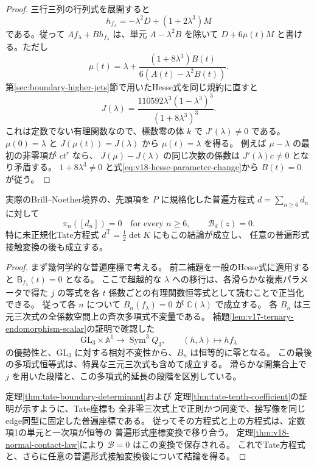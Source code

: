 \begin{proof}
三行三列の行列式を展開すると
\[
 h_{f_\lambda}=-\lambda^2D+(1+2\lambda^3)M
\]
である。従って $A f_\lambda+B h_{f_\lambda}$ は、単元 $A-\lambda^2B$ を除いて
$D+6\mu(t)M$ と書ける。ただし
\begin{equation}\label{eq:v18-hesse-parameter-change}
 \mu(t)=\lambda+
 \frac{(1+8\lambda^3)B(t)}{6(A(t)-\lambda^2B(t))}.
\end{equation}
第\ref{sec:boundary-higher-jets}節で用いたHesse式を同じ規約に直すと
\begin{equation}\label{eq:v18-hesse-j-function}
 J(\lambda)=
 \frac{110592\lambda^3(1-\lambda^3)^3}{(1+8\lambda^3)^3}.
\end{equation}
これは定数でない有理関数なので、標数零の体 $k$ で $J'(\lambda)\ne0$ である。
$\mu(0)=\lambda$ と $J(\mu(t))=J(\lambda)$ から $\mu(t)=\lambda$ を得る。
例えば $\mu-\lambda$ の最初の非零項が $c t^r$ なら、
$J(\mu)-J(\lambda)$ の同じ次数の係数は $J'(\lambda)c\ne0$ となり矛盾する。
$1+8\lambda^3\ne0$ と式\eqref{eq:v18-hesse-parameter-change}から $B(t)=0$ が従う。
\end{proof}

\begin{theorem}[実際の境界の全次数normal消滅]
\label{thm:v18-all-order-normal-vanishing}
実際のBrill--Noether境界の、先頭項を $P$ に規格化した普遍方程式
$d=\sum_{n\ge6}d_n$ に対して
\begin{equation}\label{eq:v18-all-order-normal-vanishing}
 \boxed{\displaystyle
  \pi_n([d_n])=0\quad\text{for every }n\ge6,\qquad
  \mathcal B_d(z)=0.}
\end{equation}
特に未正規化Tate方程式 $d^{\mathrm T}=\frac12\det K$ にもこの結論が成立し、
任意の普遍形式接触変換の後も成立する。
\end{theorem}

\begin{proof}
まず幾何学的な普遍座標で考える。
前二補題を一般のHesse式に適用すると
$\mathsf B_{f_\lambda}(t)=0$ となる。
ここで超越的な $\lambda$ への移行は、各滑らかな複素パラメータで得た
$j$ の等式を各 $t$ 係数ごとの有理関数恒等式として読むことで正当化できる。
従って各 $n$ について $B_n(f_\lambda)=0$ が $\mathbb C(\lambda)$ で成立する。
各 $B_n$ は三元三次式の全係数空間上の斉次多項式不変量である。
補題\ref{lem:v17-ternary-endomorphism-scalar}の証明で確認した
\[
 \mathrm{GL}_3\times\mathbb A^1\longrightarrow\operatorname{Sym}^3Q_3,
 \qquad(h,\lambda)\longmapsto h f_\lambda
\]
の優勢性と、$\mathrm{GL}_3$ に対する相対不変性から、$B_n$ は恒等的に零となる。
この最後の多項式恒等式は、特異な三元三次式も含めて成立する。
滑らかな開集合上で $j$ を用いた段階と、この多項式的延長の段階を区別している。

定理\ref{thm:tate-boundary-determinant}および
定理\ref{thm:tate-tenth-coefficient}の証明が示すように、Tate座標も
全非零三次式上で正則かつ同変で、接写像を同じedge同型に固定した普遍座標である。
従ってその方程式と上の方程式は、定数項1の単元と一次項が恒等の
普遍形式座標変換で移り合う。
定理\ref{thm:v18-normal-contact-law}により $\mathcal B=0$ はこの変換で保存される。
これでTate方程式と、さらに任意の普遍形式接触変換後について結論を得る。
\end{proof}

